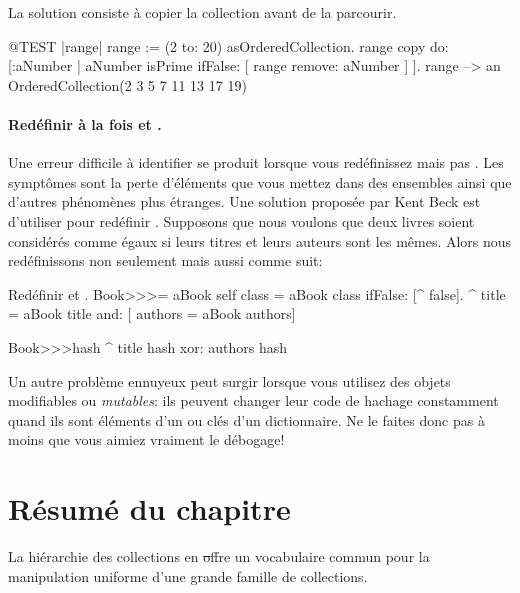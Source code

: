 \documentclass[a4paper,10pt,twoside]{book}
\begin{document}
La solution consiste \`a copier la collection avant de la parcourir.
\begin{code}{@TEST |range|}
range := (2 to: 20) asOrderedCollection.
range copy do: [:aNumber | aNumber isPrime ifFalse: [ range remove: aNumber ] ].
range --> an OrderedCollection(2 3 5 7 11 13 17 19)
\end{code}

\paragraph{Red\'efinir \`a la fois \ct{=} et .}
Une erreur difficile \`a identifier se produit lorsque vous
red\'efinissez \ct{=} mais pas . Les sympt\^omes sont
la perte d'\'el\'ements que vous mettez dans des ensembles ainsi
que d'autres ph\'enom\`enes plus \'etranges. Une solution propos\'ee
par Kent Beck est d'utiliser  pour red\'efinir .
Supposons que nous voulons que deux livres soient consid\'er\'es comme
\'egaux si leurs titres et leurs auteurs sont les m\^emes.
Alors nous red\'efinissons non seulement
\ct{=} mais aussi  comme suit:

\begin{method}{Red\'efinir \lct{=} et .}
Book>>>= aBook
   self class = aBook class ifFalse: [^ false].
   ^ title = aBook title and: [ authors = aBook authors]

Book>>>hash 
   ^ title hash xor: authors hash
\end{method}

Un autre probl\`eme ennuyeux peut surgir lorsque vous utilisez des
objets modifiables ou \emph{mutables}: ils peuvent changer leur
code de hachage constamment quand ils sont \'el\'ements d'un 
ou cl\'es d'un dictionnaire. 
Ne le faites donc pas à moins que vous aimiez vraiment le d\'ebogage!

\section{R\'esum\'e du chapitre}

La hi\'erarchie des collections en \st offre un vocabulaire commun pour la manipulation uniforme d'une grande famille de collections.
\end{document}
